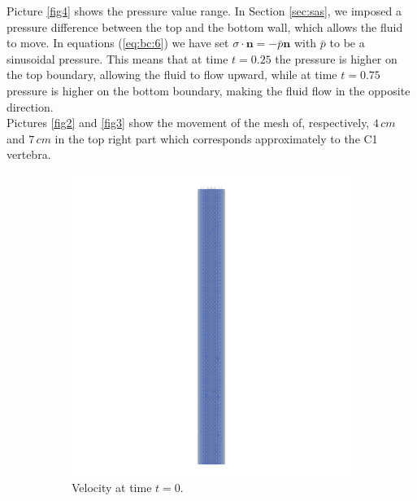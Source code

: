 \documentclass[a4paper,11pt,openright,twoside]{book}
\begin{document}
Picture \ref{fig4} shows the pressure value range. In Section \ref{sec:sas}, we imposed a pressure difference between the top and the bottom wall, which allows the fluid to move. In equations (\ref{eq:bc:6}) we have set $\sigma \cdot \mathbf{n} = -\bar{p}  \mathbf{n}$ with $\bar{p}$ to be a sinusoidal pressure. This means that at time $t=0.25$ the pressure is higher on the top boundary, allowing the fluid to flow upward, while at time $t=0.75$ pressure is higher on the bottom boundary, making the fluid flow in the opposite direction. \\

Pictures \ref{fig2} and \ref{fig3} show the movement of the mesh of, respectively, $4 \, cm$ and $7 \, cm$ in the top right part which corresponds approximately to the C1 vertebra. 

\begin{figure}[h!] 
  \begin{subfigure}[b]{0.5\linewidth}
    \centering
    \includegraphics[width=1.2\linewidth]{images/velocity_fixed_0.png} 
        \centering
    \caption{Velocity at time $t = 0$.} 
    \label{fig1:a} 
    \vspace{4ex}
  \end{subfigure}%
  \begin{subfigure}[b]{0.5\linewidth}

\end{subfigure}
\end{figure}
\end{document}

